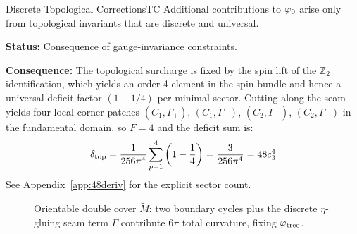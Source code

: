 \begin{axiom}{Discrete Topological Corrections}{TC}
Additional contributions to $\varphi_0$ arise only from topological invariants 
that are discrete and universal.

\tcblower
\textbf{Status:} Consequence of gauge-invariance constraints.

\textbf{Consequence:} The topological surcharge is fixed by the spin lift of the
$\mathbb{Z}_2$ identification, which yields an order-4 element in the spin bundle
and hence a universal deficit factor $(1-1/4)$ per minimal sector. Cutting along the
seam yields four local corner patches $(C_1,\Gamma_+)$, $(C_1,\Gamma_-)$, $(C_2,\Gamma_+)$,
$(C_2,\Gamma_-)$ in the fundamental domain, so $F=4$ and the deficit sum is:
\begin{equation}
    \delta_{\mathrm{top}} 
    = \frac{1}{256\pi^4}\sum_{p=1}^{4}\left(1-\frac{1}{4}\right)
    = \frac{3}{256\pi^4}
    = 48c_3^4
\end{equation}
See Appendix~\ref{app:48deriv} for the explicit sector count.
\end{axiom}

\begin{figure}[H]
\centering
{}
\caption{Orientable double cover $\widetilde{M}$: two boundary cycles plus the discrete
$\eta$-gluing seam term $\Gamma$ contribute $6\pi$ total curvature, fixing $\varphi_{\mathrm{tree}}$.}
\label{fig:doublecover}
\end{figure}

